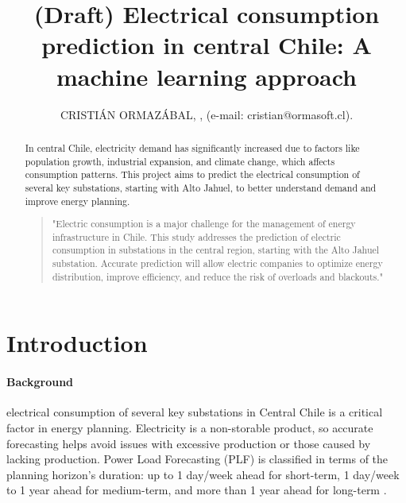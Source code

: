 \documentclass{ieeeaccess}
\begin{document}

\title{(Draft) Electrical consumption prediction in central Chile: A machine learning approach}
\author{\uppercase{Cristián Ormazábal}, , (e-mail: cristian@ormasoft.cl).}

\begin{abstract}
    In central Chile, electricity demand has significantly increased due to factors
    like population growth, industrial expansion, and climate change, which affects consumption
    patterns. This project aims to predict the electrical consumption of several key substations,
    starting with Alto Jahuel, to better understand demand and improve energy planning.
    
\begin{quotation}
"Electric consumption is a major challenge for the management of energy infrastructure in 
    Chile. This study addresses the prediction of electric consumption in substations in the central
    region, starting with the Alto Jahuel substation. Accurate prediction will allow electric companies
    to optimize energy distribution, improve efficiency, and reduce the risk of overloads and blackouts."
    \end{quotation}
    
\end{abstract}


\titlepgskip=-15pt

\maketitle

\section{Introduction}
\label{sec:introduction}
\paragraph{Background}  electrical consumption of several key substations in Central 
Chile is a critical factor in energy planning. Electricity is a non-storable product, so accurate
 forecasting helps avoid issues with excessive production or those caused by lacking production.
  Power Load Forecasting (PLF) is classified in terms of the planning horizon’s duration: up to 1
   day/week ahead for short-term, 1 day/week to 1 year ahead for medium-term, and more than 1 year
    ahead for long-term \cite{3}.
\end{document}
